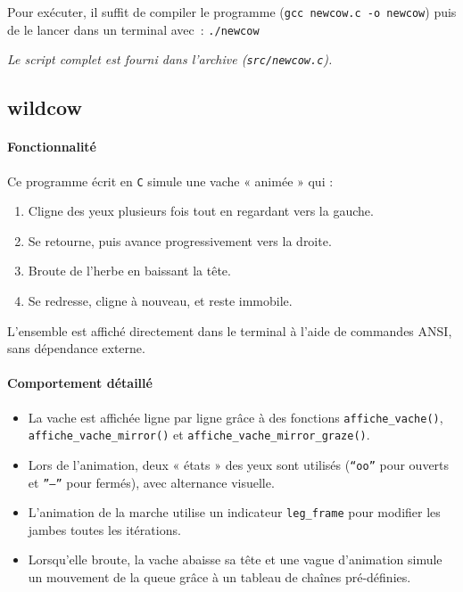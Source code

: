 \documentclass[a4paper,french,11pt]{article}
\begin{document}
\medskip
\noindent Pour exécuter, il suffit de compiler le programme (\texttt{gcc newcow.c -o newcow}) puis de le lancer dans un terminal avec : \texttt{./newcow}

\medskip
\noindent\emph{Le script complet est fourni dans l’archive (\texttt{src/newcow.c}).}

\newpage

\subsection{wildcow}

\paragraph{Fonctionnalité}

Ce programme écrit en \texttt{C} simule une vache « animée » qui :
\begin{enumerate}
\item Cligne des yeux plusieurs fois tout en regardant vers la gauche.
\item Se retourne, puis avance progressivement vers la droite.
\item Broute de l’herbe en baissant la tête.
\item Se redresse, cligne à nouveau, et reste immobile.
\end{enumerate}

L’ensemble est affiché directement dans le terminal à l’aide de commandes ANSI, sans dépendance externe.

\paragraph{Comportement détaillé}
\begin{itemize}
\item La vache est affichée ligne par ligne grâce à des fonctions \texttt{affiche\_vache()}, \texttt{affiche\_vache\_mirror()} et \texttt{affiche\_vache\_mirror\_graze()}.
\item Lors de l’animation, deux « états » des yeux sont utilisés (\texttt{“oo”} pour ouverts et \texttt{”–”} pour fermés), avec alternance visuelle.
\item L’animation de la marche utilise un indicateur \texttt{leg\_frame} pour modifier les jambes toutes les itérations.
\item Lorsqu’elle broute, la vache abaisse sa tête et une vague d’animation simule un mouvement de la queue grâce à un tableau de chaînes pré-définies.
\end{itemize}
\end{document}
